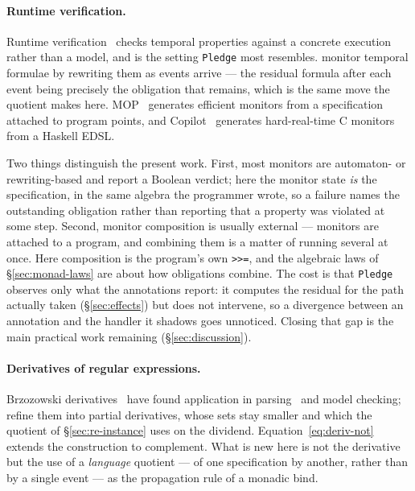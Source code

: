 \documentclass[acmsmall,screen]{acmart}
\begin{document}
\paragraph{Runtime verification.}
Runtime verification~\cite{leucker2009} checks temporal properties against a
concrete execution rather than a model, and is the setting
\lstinline{Pledge} most resembles.
\citet{havelund2001rewriting} monitor temporal formulae by rewriting them as
events arrive --- the residual formula after each event being precisely the
obligation that remains, which is the same move the quotient makes here.
MOP~\cite{chen2007mop} generates efficient monitors from a specification
attached to program points, and Copilot~\cite{pike2010copilot} generates
hard-real-time C monitors from a Haskell EDSL.

Two things distinguish the present work.
First, most monitors are automaton- or rewriting-based and report a Boolean
verdict; here the monitor state \emph{is} the specification, in the same
algebra the programmer wrote, so a failure names the outstanding obligation
rather than reporting that a property was violated at some step.
Second, monitor composition is usually external --- monitors are attached to
a program, and combining them is a matter of running several at once.
Here composition is the program's own \lstinline{>>=}, and the algebraic
laws of \S\ref{sec:monad-laws} are about how obligations combine.
The cost is that \lstinline{Pledge} observes only what the annotations
report: it computes the residual for the path actually taken (\S\ref{sec:effects})
but does not intervene, so a divergence between an annotation and the
handler it shadows goes unnoticed.
Closing that gap is the main practical work remaining (\S\ref{sec:discussion}).

\paragraph{Derivatives of regular expressions.}
Brzozowski derivatives~\cite{brzozowski1964} have found application in
parsing~\cite{owens2009,might2011} and model checking;
\citet{antimirov1996} refine them into partial derivatives, whose sets stay
smaller and which the quotient of \S\ref{sec:re-instance} uses on the
dividend.
Equation~\eqref{eq:deriv-not} extends the construction to complement.
What is new here is not the derivative but the use of a \emph{language}
quotient --- of one specification by another, rather than by a single event
--- as the propagation rule of a monadic bind.
\end{document}
